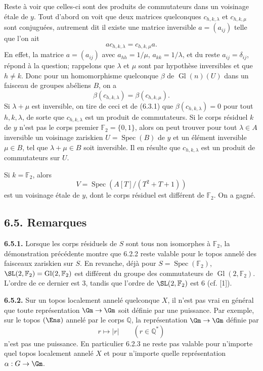 \documentclass[11pt]{article}
\newcommand{\Spec}{\operatorname{Spec}}
\providecommand{\Gl}{\operatorname{Gl}}
\begin{document}
Reste à voir que celles-ci sont des produits de commutateurs dans un voisinage étale de \(y\). Tout d'abord on voit que deux matrices quelconques \(c_{h,k,\lambda}\) et \(c_{h,k,\mu}\) sont conjuguées, autrement dit il existe une matrice inversible \(a=(a_{ij})\) telle que l'on ait
\[
 ac_{h,k,\lambda}=c_{h,k,\mu}a.
\]
En effet, la matrice \(a=(a_{ij})\) avec \(a_{hh}=1/\mu\), \(a_{kk}=1/\lambda\), et du reste \(a_{ij}=\delta_{ij}\), répond à la question; rappelons que \(\lambda\) et \(\mu\) sont par hypothèse inversibles et que \(h\ne k\). Donc pour un homomorphisme quelconque \(\beta\) de \(\Gl(n)(U)\) dans un faisceau de groupes abéliens \(B\), on a
\[
 \beta(c_{h,k,\lambda})=\beta(c_{h,k,\mu}).
\]
Si \(\lambda+\mu\) est inversible, on tire de ceci et de (6.3.1) que \(\beta(c_{h,k,\lambda})=0\) pour tout \(h,k,\lambda\), de sorte que \(c_{h,k,\lambda}\) est un produit de commutateurs. Si le corps résiduel \(k\) de \(y\) n'est pas le corps premier \(\mathbb F_2=\{0,1\}\), alors on peut trouver pour tout \(\lambda\in A\) inversible un voisinage zariskien \(U=\Spec(B)\) de \(y\) et un élément inversible \(\mu\in B\), tel que \(\lambda+\mu\in B\) soit inversible. Il en résulte que \(c_{h,k,\lambda}\) est un produit de commutateurs sur \(U\).

Si \(k=\mathbb F_2\), alors
\[
 V=\Spec(A[T]/(T^2+T+1))
\]
est un voisinage étale de \(y\), dont le corps résiduel est différent de \(\mathbb F_2\). On a gagné.

\subsection*{6.5. Remarques}
\textbf{6.5.1.} Lorsque les corps résiduels de \(S\) sont tous non isomorphes à \(\mathbb F_2\), la démonstration précédente montre que 6.2.2 reste valable pour le topos annelé des faisceaux zariskien sur \(S\). En revanche, déjà pour \(S=\Spec(\mathbb F_2)\), \(\SL(2,\mathbb F_2)=\Gl(2,\mathbb F_2)\) est différent du groupe des commutateurs de \(\Gl(2,\mathbb F_2)\). L'ordre de ce dernier est \(3\), tandis que l'ordre de \(\SL(2,\mathbb F_2)\) est \(6\) (cf. [1]).

\textbf{6.5.2.} Sur un topos localement annelé quelconque \(X\), il n'est pas vrai en général que toute représentation \(\Gm\to\Gm\) soit définie par une puissance. Par exemple, sur le topos \((\Ens)\) annelé par le corps \(\mathbb Q\), la représentation \(\Gm\to\Gm\) définie par
\[
 r\longmapsto |r|\qquad(r\in\mathbb Q^*)
\]
n'est pas une puissance. En particulier 6.2.3 ne reste pas valable pour n'importe quel topos localement annelé \(X\) et pour n'importe quelle représentation \(\alpha:G\to\Gm\).
\end{document}
